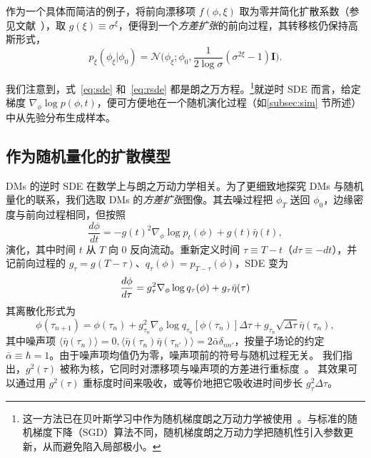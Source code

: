 作为一个具体而简洁的例子，将前向漂移项 $f(\phi,\xi)$ 取为零并简化扩散系数（参见文献~\cite{song2021scorebased}），取 $g(\xi) \equiv \sigma^{\xi}$，便得到一个\textit{方差扩张}的前向过程，其转移核仍保持高斯形式，
\begin{equation}
    p_{\xi}(\phi_\xi | \phi_0) = \mathcal{N}\bigg(\phi_\xi; \phi_0, \frac{1}{2\log \sigma}(\sigma^{2\xi} - 1) \mathbf{I}\bigg).
    \label{eq:sbm}
\end{equation}


我们注意到，式~\eqref{eq:sde} 和~\eqref{eq:rsde} 都是朗之万方程。\footnote{这一方法已在贝叶斯学习中作为随机梯度朗之万动力学被使用~\cite{welling:2011bayesian}。与标准的随机梯度下降（SGD）算法不同，随机梯度朗之万动力学把随机性引入参数更新，从而避免陷入局部极小。}就逆时 SDE 而言，给定梯度 $\nabla_{\phi}\log p(\phi,t)$，便可方便地在{一个随机演化过程（如\ref{subsec:sim} 节所述）中从先验分布生成样本。}


\subsection{作为随机量化的扩散模型}

DMs 的逆时 SDE 在数学上与朗之万动力学相关。为了更细致地探究 DMs 与随机量化的联系，我们选取 DMs 的\textit{方差扩张}图像。其去噪过程把 $\phi_T$ 送回 $\phi_0$，边缘密度与前向过程相同，但按照
\begin{equation}
    \frac{d\phi}{dt} =  - g(t)^2 \nabla_\phi \log{p_t(\phi)} +  g(t) \bar{\eta}(t),
\end{equation}
演化，其中时间 $t$ 从 $T$ 向 0 反向流动。重新定义时间 $\tau\equiv T-t$（$d\tau \equiv -dt$），并记前向过程的 $g_\tau=g(T-\tau)$、$q_{\tau}(\phi)=p_{T-\tau}(\phi)$，SDE 变为
\begin{equation}
    \frac{d\phi}{d\tau} = g_\tau^2\nabla_\phi \log{q_{\tau}(\phi)} + g_\tau\bar{\eta}(\tau) \label{eq:dmle}\\
\end{equation}
其离散化形式为
\begin{equation}
    \phi(\tau_{n+1}) = \phi(\tau_n) +  g_{\tau_n}^2\nabla_\phi \log{q_{\tau_n}[\phi(\tau_n)]} \Delta\tau +  g_{\tau_n}\sqrt{\Delta\tau}\bar{\eta}(\tau_n),
\end{equation}
其中噪声项 $\langle\bar{\eta}(\tau_n)\rangle = 0, \langle\bar{\eta}(\tau_n)\bar{\eta}(\tau_{n'})\rangle = 2\bar\alpha\delta_{nn'}$，{按量子场论的约定 $\bar{\alpha} \equiv \hbar =1$}。由于噪声项均值仍为零，噪声项前的符号与随机过程无关。
我们指出，$g^2(\tau)$ 被称为核，它同时对漂移项与噪声项的方差进行重标度~\cite{Damgaard:1987rr}。
其效果可以通过用 $g^2(\tau)$ 重标度时间来吸收，或等价地把它吸收进时间步长 $ g_\tau^2\Delta\tau$。

